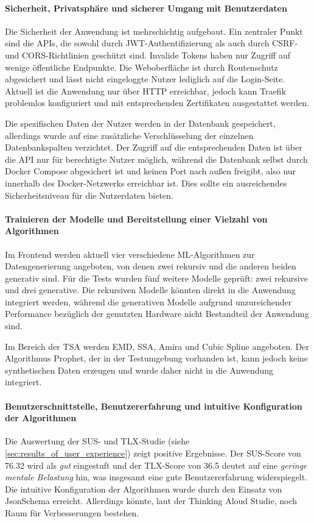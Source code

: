 \paragraph*{Sicherheit, Privatsphäre und sicherer Umgang mit Benutzerdaten}
Die Sicherheit der Anwendung ist mehrschichtig aufgebaut. Ein zentraler Punkt sind die APIs, die sowohl durch JWT-Authentifizierung als auch durch \ac{CSRF}- und \ac{CORS}-Richtlinien geschützt sind. 
Invalide Tokens haben nur Zugriff auf wenige öffentliche Endpunkte.
Die Weboberfläche ist durch Routenschutz abgesichert und lässt nicht eingeloggte Nutzer lediglich auf die Login-Seite. Aktuell ist die Anwendung nur über HTTP erreichbar, jedoch kann Traefik 
problemlos konfiguriert und mit entsprechenden Zertifikaten ausgestattet werden.

Die spezifischen Daten der Nutzer werden in der Datenbank gespeichert, allerdings wurde auf eine zusätzliche Verschlüsselung der einzelnen Datenbankspalten verzichtet. Der Zugriff auf die 
entsprechenden Daten ist über die API nur für berechtigte Nutzer möglich, während die Datenbank selbst durch Docker Compose abgesichert ist und keinen Port nach außen freigibt, also nur innerhalb des Docker-Netzwerks erreichbar ist. Dies sollte ein ausreichendes Sicherheitsniveau für die Nutzerdaten bieten.

\paragraph*{Trainieren der Modelle und Bereitstellung einer Vielzahl von Algorithmen}
Im Frontend werden aktuell vier verschiedene \ac{ML}-Algorithmen zur Datengenerierung angeboten, von denen zwei rekursiv und die anderen beiden generativ sind. Für die Tests wurden fünf 
weitere Modelle geprüft: zwei rekursive und drei generative. Die rekursiven Modelle könnten direkt in die Anwendung integriert werden, während die generativen Modelle aufgrund unzureichender Performance bezüglich der genutzten Hardware nicht Bestandteil der Anwendung sind.

Im Bereich der \ac{TSA} werden \ac{EMD}, \ac{SSA}, Amira und Cubic Spline angeboten. Der Algorithmus Prophet, der in der Testumgebung vorhanden ist, kann jedoch keine synthetischen 
Daten erzeugen und wurde daher nicht in die Anwendung integriert.


\paragraph*{Benutzerschnittstelle, Benutzererfahrung und intuitive Konfiguration der Algorithmen}
Die Auswertung der SUS- und TLX-Studie (siehe \ref{sec:results_of_user_experience}) zeigt positive Ergebnisse. Der SUS-Score von 76.32 wird als \textit{gut} eingestuft und der 
TLX-Score von 36.5 deutet auf eine \textit{geringe mentale Belastung} hin, was insgesamt eine gute Benutzererfahrung widerspiegelt. Die intuitive Konfiguration der Algorithmen wurde durch 
den Einsatz von JsonSchema erreicht. Allerdings könnte, laut der Thinking Aloud Studie, noch Raum für Verbesserungen bestehen.

